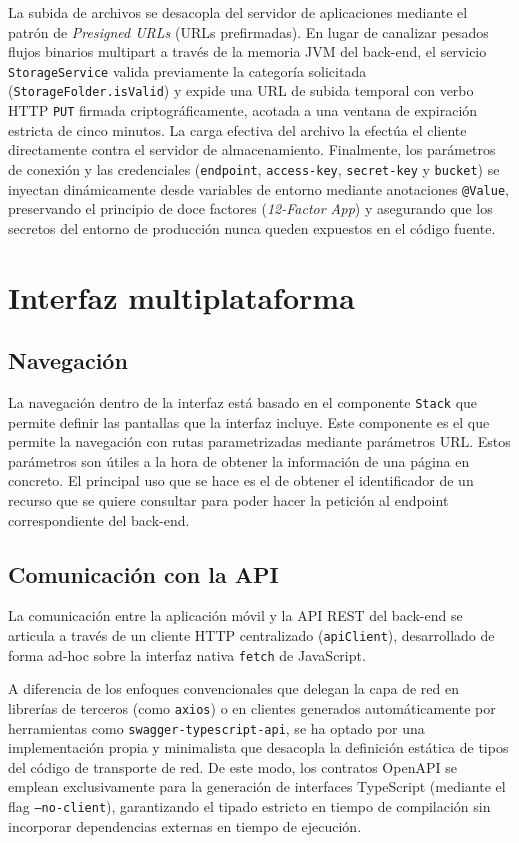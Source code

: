 La subida de archivos se desacopla del servidor de aplicaciones mediante el patrón de \emph{Presigned URLs} (URLs prefirmadas). En lugar de canalizar pesados flujos binarios multipart a través de la memoria JVM del back-end, el servicio \texttt{StorageService} valida previamente la categoría solicitada (\texttt{StorageFolder.isValid}) y expide una URL de subida temporal con verbo HTTP \texttt{PUT} firmada criptográficamente, acotada a una ventana de expiración estricta de cinco minutos. La carga efectiva del archivo la efectúa el cliente directamente contra el servidor de almacenamiento. Finalmente, los parámetros de conexión y las credenciales (\texttt{endpoint}, \texttt{access-key}, \texttt{secret-key} y \texttt{bucket}) se inyectan dinámicamente desde variables de entorno mediante anotaciones \texttt{@Value}, preservando el principio de doce factores (\emph{12-Factor App}) y asegurando que los secretos del entorno de producción nunca queden expuestos en el código fuente.

\section{Interfaz multiplataforma}

\subsection{Navegación}
La navegación dentro de la interfaz está basado en el componente \texttt{Stack} que permite definir las pantallas que la interfaz incluye. Este componente es el que permite la navegación con rutas parametrizadas mediante parámetros URL. Estos parámetros son útiles a la hora de obtener la información de una página en concreto. El principal uso que se hace es el de obtener el identificador de un recurso que se quiere consultar para poder hacer la petición al endpoint correspondiente del back-end.

\subsection{Comunicación con la API}
La comunicación entre la aplicación móvil y la API REST del back-end se articula a través de un cliente HTTP centralizado (\texttt{apiClient}), desarrollado de forma ad-hoc sobre la interfaz nativa \texttt{fetch} de JavaScript.

A diferencia de los enfoques convencionales que delegan la capa de red en librerías de terceros (como \texttt{axios}) o en clientes generados automáticamente por herramientas como \texttt{swagger-typescript-api}, se ha optado por una implementación propia y minimalista que desacopla la definición estática de tipos del código de transporte de red. De este modo, los contratos OpenAPI se emplean exclusivamente para la generación de interfaces TypeScript (mediante el flag \texttt{--no-client}), garantizando el tipado estricto en tiempo de compilación sin incorporar dependencias externas en tiempo de ejecución.


